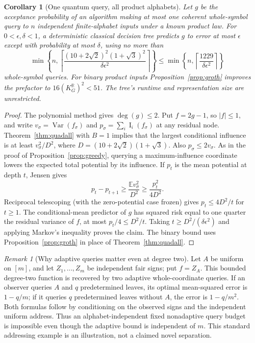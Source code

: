\documentclass[11pt]{article}
\numberwithin{equation}{section}
\newtheorem{corollary}[theorem]{Corollary}
\theoremstyle{remark}
\newtheorem{remark}[theorem]{Remark}
\newcommand{\E}{\mathbb E}
\newcommand{\Var}{\operatorname{Var}}
\newcommand{\Inf}{\operatorname{I}}
\newcommand{\Dquad}{(10+2\sqrt2)(1+\sqrt3)}
\newcommand{\Kquad}{(10+2\sqrt2)^2(1+\sqrt3)^2}
\begin{document}
\begin{corollary}[One quantum query, all product alphabets]\label{cor:onequery}
Let $g$ be the acceptance probability of an algorithm making at most one coherent whole-symbol query to $n$ independent finite-alphabet inputs under a known product law. For $0<\epsilon,\delta<1$, a deterministic classical decision tree predicts $g$ to error at most $\epsilon$ except with probability at most $\delta$, using no more than
\begin{equation}\label{eq:onequery}
 \min\left\{n,\left\lceil\frac{\Kquad}{\delta\epsilon^2}\right\rceil\right\}
 \le \min\left\{n,\left\lceil\frac{1229}{\delta\epsilon^2}\right\rceil\right\}
\end{equation}
whole-symbol queries. For binary product inputs Proposition~\ref{prop:groth} improves the prefactor to $16(K_G^{\mathbb R})^2<51$. The tree's runtime and representation size are unrestricted.
\end{corollary}
\begin{proof}
The polynomial method gives $\deg(g)\le2$. Put $f=2g-1$, so $|f|\le1$, and write $v_\sigma=\Var(f_\sigma)$ and $p_\sigma=\sum_i\Inf_i(f_\sigma)$ at any residual node. Theorem~\ref{thm:quadall} with $B=1$ implies that the largest conditional influence is at least $v_\sigma^2/D^2$, where $D=\Dquad$. Also $p_\sigma\le2v_\sigma$. As in the proof of Proposition~\ref{prop:greedy}, querying a maximum-influence coordinate lowers the expected total potential by its influence. If $p_t$ is the mean potential at depth $t$, Jensen gives
\[
 p_t-p_{t+1}\ge\frac{\E v_\sigma^2}{D^2}\ge\frac{p_t^2}{4D^2}.
\]
Reciprocal telescoping (with the zero-potential case frozen) gives $p_t\le4D^2/t$ for $t\ge1$. The conditional-mean predictor of $g$ has squared risk equal to one quarter the residual variance of $f$, at most $p_t/4\le D^2/t$. Taking $t\ge D^2/(\delta\epsilon^2)$ and applying Markov's inequality proves the claim. The binary bound uses Proposition~\ref{prop:groth} in place of Theorem~\ref{thm:quadall}.\end{proof}

\begin{remark}[Why adaptive queries matter even at degree two]\label{rem:address}
Let $A$ be uniform on $[m]$, and let $Z_1,\dots,Z_m$ be independent fair signs; put $f=Z_A$. This bounded degree-two function is recovered by two adaptive whole-coordinate queries. If an observer queries $A$ and $q$ predetermined leaves, its optimal mean-squared error is $1-q/m$; if it queries $q$ predetermined leaves without $A$, the error is $1-q/m^2$. Both formulas follow by conditioning on the observed signs and the independent uniform address. Thus an alphabet-independent fixed nonadaptive query budget is impossible even though the adaptive bound is independent of $m$. This standard addressing example is an illustration, not a claimed novel separation.
\end{remark}
\end{document}
